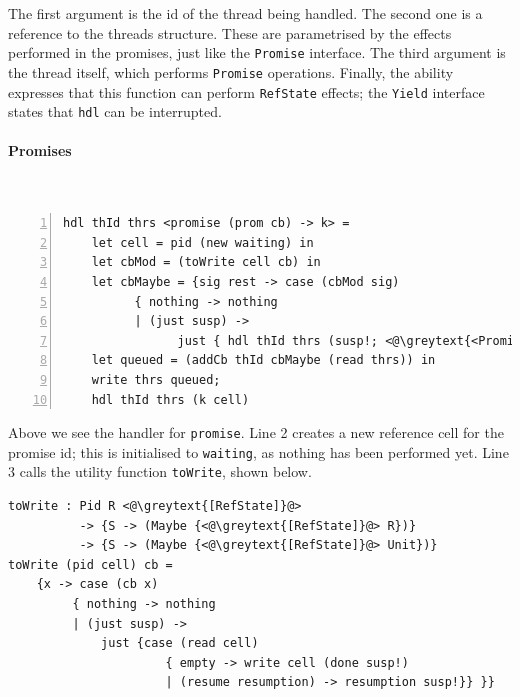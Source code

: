 \documentclass[msc,deptreport,cs]{infthesis} %
\newcommand{\code}[1]{\lstinline{#1}}
\newcommand{\greytext}[1]{\textcolor{black!40}{#1}}
\begin{document}
The first argument is the id of the thread being handled. The second one is a
reference to the threads structure. These are parametrised by the effects
performed in the promises, just like the \code{Promise} interface. The third
argument is the thread itself, which performs \code{Promise} operations.
%
Finally, the ability expresses that this function can perform \code{RefState}
effects; the \code{Yield} interface states that \code{hdl} can be interrupted.

\paragraph*{Promises}~
\begin{lstlisting}[numbers=left]
hdl thId thrs <promise (prom cb) -> k> =
    let cell = pid (new waiting) in
    let cbMod = (toWrite cell cb) in
    let cbMaybe = {sig rest -> case (cbMod sig)
          { nothing -> nothing
          | (just susp) ->
                just { hdl thId thrs (susp!; <@\greytext{<Promise>}@> rest!)} }} in
    let queued = (addCb thId cbMaybe (read thrs)) in
    write thrs queued;
    hdl thId thrs (k cell)
\end{lstlisting}

Above we see the handler for \code{promise}. Line 2 creates a new reference cell
for the promise id; this is initialised to \code{waiting}, as nothing has been
performed yet. Line 3 calls the utility function \code{toWrite}, shown below.


\begin{lstlisting}
toWrite : Pid R <@\greytext{[RefState]}@>
          -> {S -> (Maybe {<@\greytext{[RefState]}@> R})}
          -> {S -> (Maybe {<@\greytext{[RefState]}@> Unit})}
toWrite (pid cell) cb =
    {x -> case (cb x)
         { nothing -> nothing
         | (just susp) ->
             just {case (read cell)
                      { empty -> write cell (done susp!)
                      | (resume resumption) -> resumption susp!}} }}
\end{lstlisting}
\end{document}
